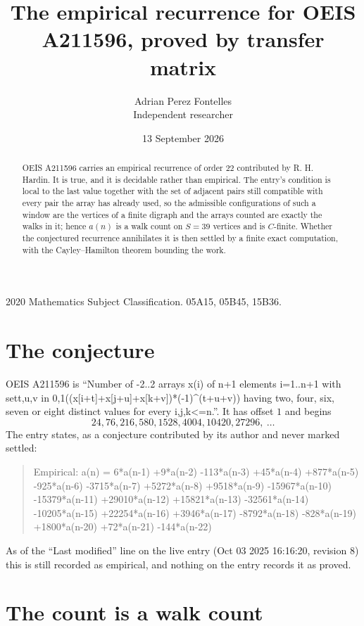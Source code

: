 \documentclass[11pt,a4paper]{article}
\title{The empirical recurrence for OEIS A211596, proved by transfer matrix}
\author{Adrian Perez Fontelles\\ \small Independent researcher}
\date{13 September 2026}
\theoremstyle{plain}
\theoremstyle{definition}
\begin{document}
\maketitle

\begin{abstract}
OEIS A211596 carries an empirical recurrence of order $22$ contributed by R. H. Hardin. It is
true, and it is decidable rather than empirical. The entry's condition is local to the last value together with the set of adjacent pairs still compatible with every pair the array has already used, so
the admissible configurations of such a window are the vertices of a finite digraph and the
arrays counted are exactly the walks in it; hence $a(n)$ is a walk count on $S=39$ vertices
and is $C$-finite. Whether the conjectured recurrence annihilates it is then settled by a
finite exact computation, with the Cayley--Hamilton theorem bounding the work.
\end{abstract}

\noindent\small 2020 Mathematics Subject Classification. 05A15, 05B45, 15B36.\normalsize

\section{The conjecture}

OEIS A211596 is ``Number of -2..2 arrays x(i) of n+1 elements i=1..n+1 with set{t,u,v in 0,1}((x[i+t]+x[j+u]+x[k+v])*(-1)\^{}(t+u+v)) having two, four, six, seven or eight distinct values for every i,j,k<=n.''. It has offset $1$ and begins
\[
24, 76, 216, 580, 1528, 4004, 10420, 27296,\ \dots
\]
The entry states, as a conjecture contributed by its author and never marked settled:
\begin{quote}
Empirical: a(n) = 6*a(n-1) +9*a(n-2) -113*a(n-3) +45*a(n-4) +877*a(n-5) -925*a(n-6) -3715*a(n-7) +5272*a(n-8) +9518*a(n-9) -15967*a(n-10) -15379*a(n-11) +29010*a(n-12) +15821*a(n-13) -32561*a(n-14) -10205*a(n-15) +22254*a(n-16) +3946*a(n-17) -8792*a(n-18) -828*a(n-19) +1800*a(n-20) +72*a(n-21) -144*a(n-22)
\end{quote}
As of the ``Last modified'' line on the live entry (Oct 03 2025 16:16:20, revision 8) this is still
recorded as empirical, and nothing on the entry records it as proved.

\section{The count is a walk count}
\end{document}
